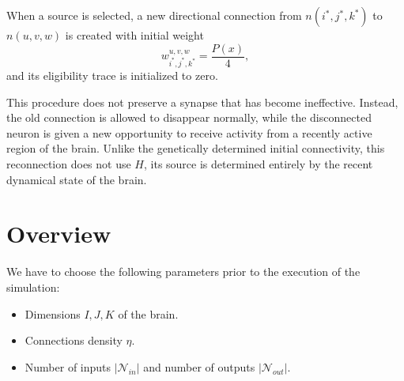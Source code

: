 \documentclass[12pt,a4paper]{article}
\begin{document}
\begin{enumerate}
	When a source is selected, a new directional connection from $n(i^\ast,j^\ast,k^\ast)$ to $n(u,v,w)$ is created with initial weight 
	$$w_{i^\ast,j^\ast,k^\ast}^{u,v,w}=\frac{P(x)}{4},$$
and its eligibility trace is initialized to zero.

	This procedure does not preserve a synapse that has become ineffective. Instead, the old connection is allowed to disappear normally, while the disconnected neuron is given a new opportunity to receive activity from a recently active region of the brain. Unlike the genetically determined initial connectivity, this reconnection does not use $H$, its source is determined entirely by the recent dynamical state of the brain.
	
\end{enumerate}

\section{Overview}
	We have to choose the following parameters prior to the execution of the simulation:
	\begin{itemize}
		\item Dimensions $I, J, K$ of the brain.
		\item Connections density $\eta$.
		\item Number of inputs $|\mathcal{N}_{in}|$ and number of outputs $|\mathcal{N}_{out}|$.
	\end{itemize}
	
\end{document}

